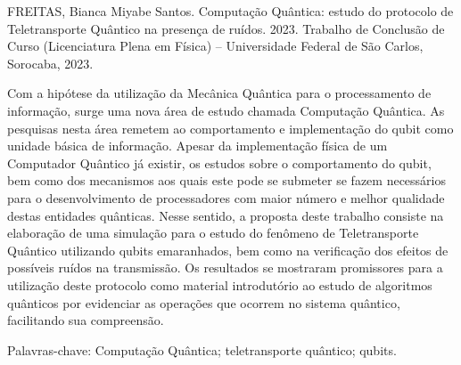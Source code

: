 
\begin{resumo} %
  FREITAS, Bianca Miyabe Santos. Computação Quântica: estudo do protocolo de Teletransporte Quântico na presença de ruídos. 2023. Trabalho de Conclusão de Curso (Licenciatura Plena em Física) -- Universidade Federal de São Carlos, Sorocaba, 2023.

  \vspace*{\onelineskip}
  Com a hipótese da utilização da Mecânica Quântica para o processamento de informação, surge uma nova área de estudo chamada Computação Quântica. As pesquisas nesta área remetem ao comportamento e implementação do qubit como unidade básica de informação. Apesar da implementação física de um Computador Quântico já existir, os estudos sobre o comportamento do qubit, bem como dos mecanismos aos quais este pode se submeter se fazem necessários para o desenvolvimento de processadores com maior número e melhor qualidade destas entidades quânticas. Nesse sentido, a proposta deste trabalho consiste na elaboração de uma simulação para o estudo do fenômeno de Teletransporte Quântico utilizando qubits emaranhados, bem como na verificação dos efeitos de possíveis ruídos na transmissão. Os resultados se mostraram promissores para a utilização deste protocolo como material introdutório ao estudo de algoritmos quânticos por evidenciar as operações que ocorrem no sistema quântico, facilitando sua compreensão.

  \vspace{\onelineskip}

  \noindent
  Palavras-chave: Computação Quântica; teletransporte quântico; qubits.
\end{resumo}

\cleardoublepage

